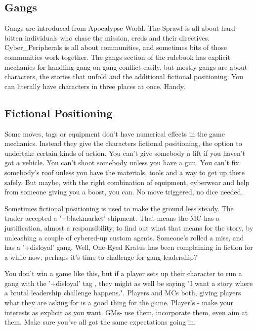 \documentclass{tufte-book}
\begin{document}
\subsection{Gangs}
Gangs are introduced from Apocalypse World. The Sprawl is all about hard-bitten individuals who chase the mission, creds and their directives. Cyber\_Peripherals is all about communities, and sometimes bits of those communities work together. The gangs section of the rulebook has explicit mechanics for handling gang on gang conflict easily, but mostly gangs are about characters, the stories that unfold and the additional fictional positioning. You can literally have characters in three places at once. Handy.

\subsection{Fictional Positioning}
Some moves, tags or equipment don't have numerical effects in the game mechanics. Instead they give the characters fictional positioning, the option to undertake certain kinds of action. You can't give somebody a lift if you haven't got a vehicle. You can't shoot somebody unless you have a gun. You can't fix somebody's roof unless you have the materials, tools and a way to get up there safely. But maybe, with the right combination of equipment, cyberwear and help from someone giving you a boost, you can. No move triggered, no dice needed.

Sometimes fictional positioning is used to make the ground less steady. The trader accepted a '+blackmarket' shipment. That means the MC has a justification, almost a responsibility, to find out what that means for the story, by unleashing a couple of cybered-up custom agents. Someone's rolled a miss, and has a '+disloyal' gang. Well, One-Eyed Kratus has been complaining in fiction for a while now, perhaps it's time to challenge for gang leadership? 

You don't win a game like this, but if a player sets up their character to run a gang with the '+disloyal' tag , they might as well be saying "I want a story where a brutal leadership challenge happens.". Players and MCs both, giving players what they are asking for is a good thing for the game. Player's -  make your interests as explicit as you want. GMs- use them, incorporate them, even aim at them. Make sure you've all got the same expectations going in. 



\mainmatter
\end{document}
